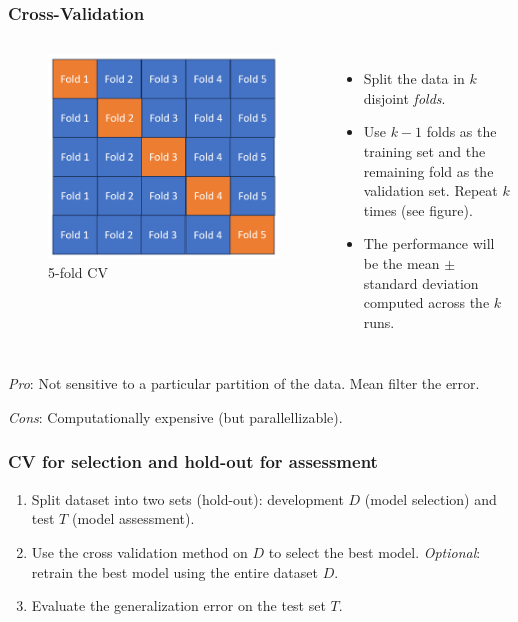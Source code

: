 \documentclass{beamer}
\begin{document}
	\begin{frame}
		\frametitle{Cross-Validation}
		\begin{columns}
			\begin{figure}
				\centering
				\includegraphics[scale=0.4]{images/cross-validation}
				\caption{5-fold CV}
			\end{figure}
			\begin{itemize}
				\item Split the data in $k$ disjoint \textit{folds}.
				\item Use $k-1$ folds as the training set and the remaining fold as the validation set. Repeat $k$ times (see figure).
				\item The performance will be the mean $\pm$ standard deviation computed across the $k$ runs.
			\end{itemize}
		\end{columns}
		
		\vspace{5mm}
		
		\textit{Pro}: Not sensitive to a particular partition of the data. Mean filter the error.
		
		\textit{Cons}: Computationally expensive (but parallellizable).
	\end{frame}

	\begin{frame}
		\frametitle{CV for selection and hold-out for assessment}
		\begin{enumerate}
			\item Split dataset into two sets (hold-out): development $D$ (model selection) and test $T$ (model assessment).
			\item Use the cross validation method on $D$ to select the best model.
			\textit{Optional}:  retrain the best model using the entire dataset $D$. 
			\item Evaluate the generalization error on the test set $T$.
		\end{enumerate}
	
	\end{frame}
\end{document}
